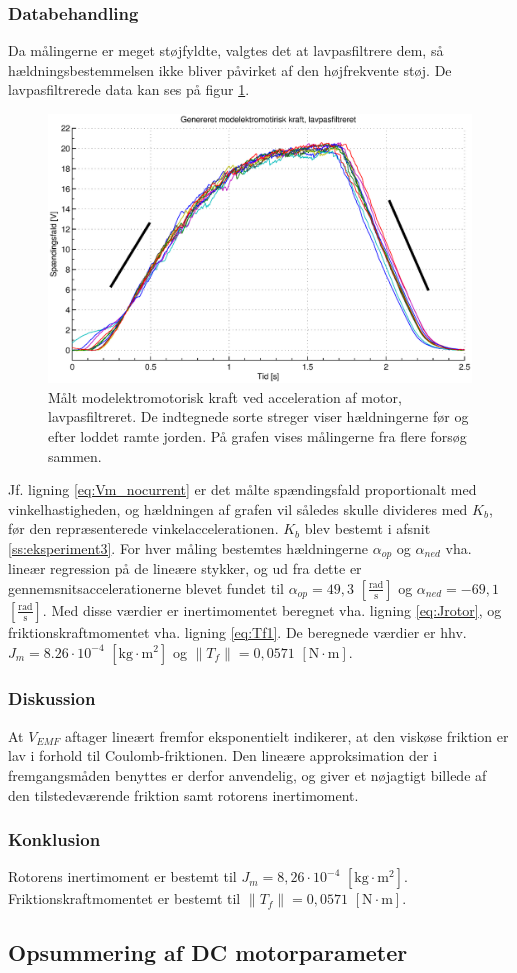 \subsubsection{Databehandling}
Da målingerne er meget støjfyldte, valgtes det at lavpasfiltrere dem, så hældningsbestemmelsen
ikke bliver påvirket af den højfrekvente støj.
De lavpasfiltrerede data kan ses på figur \ref{fig:vemf1}.
\begin{figure}[th!]
	\centering
	\includegraphics[width=1\textwidth]{./graphics/vemf1.eps}
	\caption[Målt modelektromotorisk kraft ved acceleration af motor, lavpasfiltreret]
		{Målt modelektromotorisk kraft ved acceleration af motor, lavpasfiltreret.
		De indtegnede sorte streger viser hældningerne før og efter loddet ramte jorden.
		På grafen vises målingerne fra flere forsøg sammen.}
	\label{fig:vemf1}
\end{figure}
Jf. ligning \ref{eq:Vm_nocurrent} er det målte spændingsfald proportionalt med
vinkelhastigheden, og hældningen af grafen vil således skulle divideres med \(K_b\),
før den repræsenterede vinkelaccelerationen. \(K_b\) blev bestemt i afsnit \ref{ss:eksperiment3}.
For hver måling bestemtes hældningerne \(\alpha_{op}\) og \(\alpha_{ned}\) vha. lineær regression på de lineære stykker,
og ud fra dette er gennemsnitsaccelerationerne blevet fundet til
\(\alpha_{op}=49,3\) \([\frac{\text{rad}}{\text{s}}]\) og \(\alpha_{ned}=-69,1\) \([\frac{\text{rad}}{\text{s}}]\).
Med disse værdier er inertimomentet beregnet vha. ligning \ref{eq:Jrotor}, og friktionskraftmomentet vha. ligning \ref{eq:Tf1}.
De beregnede værdier er hhv. \(J_m=8.26\cdot10^{-4}\) \([\text{kg}\cdot{\text{m}^2}]\) og \(\|T_f\|=0,0571\) \( [\text{N} \cdot \text{m}]\).
\subsubsection{Diskussion}
At \(V_{EMF}\) aftager lineært fremfor eksponentielt indikerer,
at den viskøse friktion er lav i forhold til Coulomb-friktionen.
Den lineære approksimation der i fremgangsmåden benyttes er derfor anvendelig,
og giver et nøjagtigt billede af den tilstedeværende friktion samt rotorens inertimoment.
\subsubsection{Konklusion}
Rotorens inertimoment er bestemt til \(J_m=8,26\cdot10^{-4}\) \([\text{kg}\cdot{\text{m}^2}]\).
Friktionskraftmomentet er bestemt til \(\|T_f\|=0,0571\) \( [\text{N} \cdot \text{m}]\).
\subsection{Opsummering af DC motorparameter}